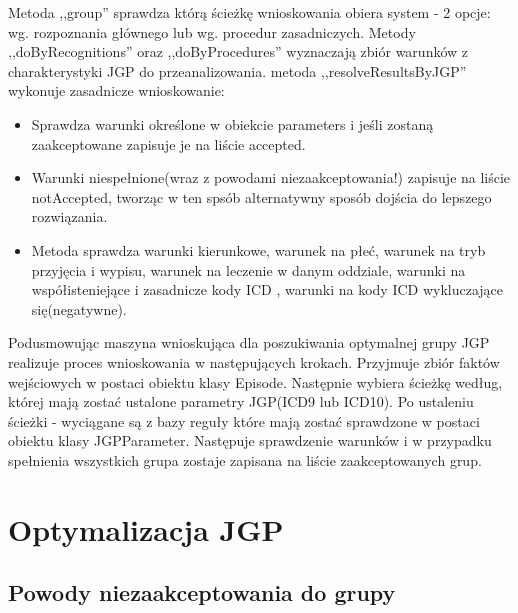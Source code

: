 Metoda ,,group'' sprawdza którą ścieżkę wnioskowania obiera system - 2 opcje: wg. rozpoznania głównego lub wg. procedur zasadniczych. Metody ,,doByRecognitions'' oraz ,,doByProcedures'' wyznaczają zbiór warunków z charakterystyki JGP do przeanalizowania. metoda ,,resolveResultsByJGP'' wykonuje zasadnicze wnioskowanie:
\begin{itemize}
\item Sprawdza warunki określone w obiekcie parameters i jeśli zostaną zaakceptowane zapisuje je na liście accepted.
\item Warunki niespełnione(wraz z powodami niezaakceptowania!) zapisuje na liście notAccepted, tworząc w ten spsób alternatywny sposób dojścia do lepszego rozwiązania.
\item Metoda sprawdza warunki kierunkowe, warunek na płeć, warunek na tryb przyjęcia i wypisu, warunek na leczenie w danym oddziale, warunki na współisteniejące i zasadnicze kody ICD , warunki na kody ICD wykluczające się(negatywne).
\end{itemize}

Podusmowując maszyna wnioskująca dla poszukiwania optymalnej grupy JGP realizuje proces wnioskowania w następujących krokach. Przyjmuje zbiór faktów wejściowych w postaci obiektu klasy Episode. Następnie wybiera ścieżkę według, której mają zostać ustalone parametry JGP(ICD9 lub ICD10). Po ustaleniu ścieżki - wyciągane są z bazy reguły które mają zostać sprawdzone w postaci obiektu klasy JGPParameter. Następuje sprawdzenie warunków i w przypadku spełnienia wszystkich grupa zostaje zapisana na liście zaakceptowanych grup.


\section{Optymalizacja JGP}
\label{sec:optymalizacjaJGP}

\subsection{Powody niezaakceptowania do grupy}
\label{sec:powodyNiezaakceptowaniaDoGrupy}
